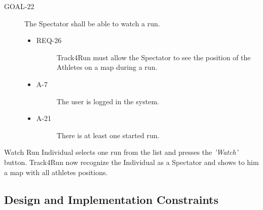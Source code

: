 \documentclass[a4paper]{article}
\newcommand{\requirement}{\ding{229}}%
\begin{document}
        \begin{description}
        	\item[GOAL-22] The Spectator shall be able to watch a run.
            	\begin{itemize}
            	    \item[\requirement]
                	\begin{description}
                	\item[REQ-26] Track4Run must allow the Spectator to see the position of the Athletes on a map during a run.
                	\end{description}
                	\item
                	\begin{description}
                	\item[A-7] The user is logged in the system.
                	\end{description}
                	\item
                	\begin{description}
                	\item[A-21] There is at least one started run.
                	\end{description}
                	\end{itemize}
        \end{description}

        \begin{usecase}{Watch Run}
              {Individual selects one run from the list and presses the \textit{'Watch'} button.}
              {Track4Run now recognize the Individual as a Spectator and shows to him a map with all athletes positions.}
        \end{usecase}
        
        \subsection{Design and Implementation Constraints}
    
\end{document}
